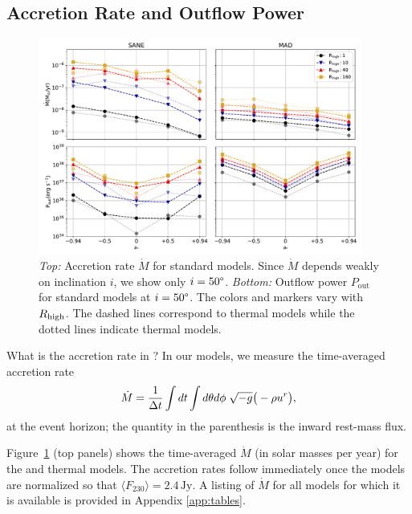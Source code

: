 \subsection{Accretion Rate and Outflow Power}
\label{sec:accrate_outflowpower}

\begin{figure}
  \centering
  \includegraphics[width=0.95\textwidth]{figures/bhac_kharma_average_mdot_pout.pdf}
  \caption{{\it Top:} Accretion rate $\dot{M}$ for standard models. Since $\dot{M}$ depends weakly on inclination $i$, we show only $i=50\degree$. {\it Bottom:} Outflow power $P_\mathrm{out}$ for standard models at $i = 50\degree$. The colors and markers vary with $R_\mathrm{high}$. The dashed lines correspond to \kharma thermal models while the dotted lines indicate \bhac thermal models.}
  \label{fig:accretion_outflow_power_illinois_thermal}
\end{figure}

What is the accretion rate in \sgra?  In our models, we measure the time-averaged accretion rate
\begin{equation}
  \dot{M} = \frac{1}{\Delta t}\int dt\int d\theta d\phi\hspace{0.1cm}\sqrt{-g}\big(-\rho u^{r}\big),
\end{equation}
at the event horizon; the quantity in the parenthesis is the inward rest-mass flux.

Figure~\ref{fig:accretion_outflow_power_illinois_thermal} (top panels) shows the time-averaged $\dot{M}$ (in solar masses per year) for the \kharma and \bhac thermal models.  The accretion rates follow immediately once the models are normalized so that $\langle F_{230}\rangle = 2.4\,\mathrm{Jy}$.  A listing of $\dot{M}$ for all models for which it is available is provided in Appendix \ref{app:tables}.

